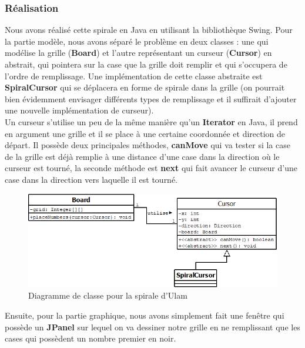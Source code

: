 \subsubsection{Réalisation}
Nous avons réalisé cette spirale en Java en utilisant la bibliothèque Swing. Pour la partie modèle, nous avons séparé le problème en deux classes : une qui modélise la grille (\textbf{Board}) et l'autre représentant un curseur (\textbf{Cursor}) en abstrait, qui pointera sur la case que la grille doit remplir et qui s'occupera de l'ordre de remplissage. Une implémentation de cette classe abstraite est \textbf{SpiralCursor} qui se déplacera en forme de spirale dans la grille (on pourrait bien évidemment envisager différents types de remplissage et il suffirait d'ajouter une nouvelle implémentation de curseur).\\ 
Un curseur s'utilise un peu de la même manière qu'un \textbf{Iterator} en Java, il prend en argument une grille et il se place à une certaine coordonnée et direction de départ. Il possède deux principales méthodes, \textbf{canMove} qui va tester si la case de la grille est déjà remplie à une distance d'une case dans la direction où le curseur est tourné, la seconde méthode est \textbf{next} qui fait avancer le curseur d'une case dans la direction vers laquelle il est tourné.\\

\begin{figure}[H]
\begin{center}
\includegraphics[scale=0.5]{images/dia_spirale.png}
\end{center}
\caption{Diagramme de classe pour la spirale d'Ulam}
\end{figure}

Ensuite, pour la partie graphique, nous avons simplement fait une fenêtre qui possède un \textbf{JPanel} sur lequel on va dessiner notre grille en ne remplissant que les cases qui possèdent un nombre premier en noir.

